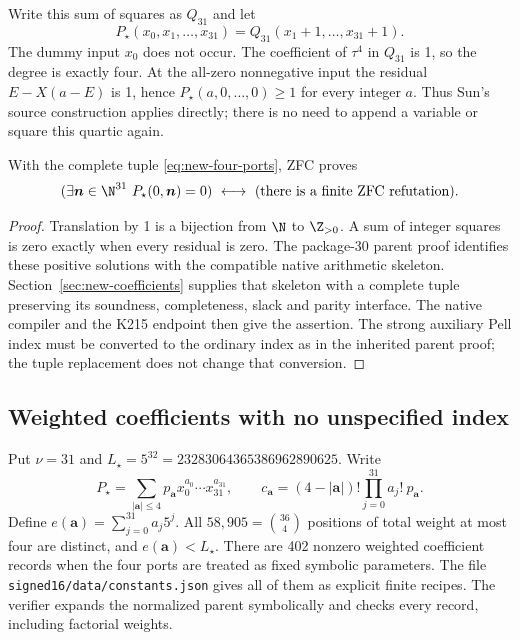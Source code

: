 Write this sum of squares as $Q_{31}$ and let
\[
 P_\star(x_0,x_1,\ldots,x_{31})
   =Q_{31}(x_1+1,\ldots,x_{31}+1).
\]
The dummy input $x_0$ does not occur.  The coefficient of $\tau^4$ in
$Q_{31}$ is 1, so the degree is exactly four.  At the all-zero
nonnegative input the residual $E-X(a-E)$ is 1, hence
$P_\star(a,0,\ldots,0)\geq1$ for every integer $a$.  Thus Sun's source
construction applies directly; there is no need to append a variable or
square this quartic again.

\begin{proposition}\label{prop:parent}
With the complete tuple \eqref{eq:new-four-ports}, ZFC proves
\[
 (\exists\boldsymbol{n}\in\N^{31}\ P_\star(0,\boldsymbol{n})=0)
 \ \longleftrightarrow\ 
 (\text{there is a finite ZFC refutation}).
\]
\end{proposition}
\begin{proof}
Translation by 1 is a bijection from $\N$ to $\Z_{>0}$.  A sum of integer
squares is zero exactly when every residual is zero.  The package-30
parent proof identifies these positive solutions with the compatible
native arithmetic skeleton.  Section~\ref{sec:new-coefficients} supplies
that skeleton with a complete tuple preserving its soundness,
completeness, slack and parity interface.  The native compiler and the
K215 endpoint then give the assertion.  The strong auxiliary Pell index
must be converted to the ordinary index as in the inherited parent
proof; the tuple replacement does not change that conversion.
\end{proof}

\subsection{Weighted coefficients with no unspecified index}

Put $\nu=31$ and $L_\star=5^{32}=23283064365386962890625$.  Write
\[
 P_\star=\sum_{|\boldsymbol{a}|\le4}p_{\boldsymbol a}
                x_0^{a_0}\cdots x_{31}^{a_{31}},\qquad
 c_{\boldsymbol a}=(4-|\boldsymbol a|)!
              \prod_{j=0}^{31}a_j!\ p_{\boldsymbol a}.
\]
Define $e(\boldsymbol a)=\sum_{j=0}^{31}a_j5^j$.
All $58,905=\binom{36}{4}$ positions of total weight at most four are
distinct, and $e(\boldsymbol a)<L_\star$.  There are 402 nonzero weighted
coefficient records when the four ports are treated as fixed symbolic
parameters.  The file \texttt{signed16/data/constants.json} gives all of
them as explicit finite recipes.  The verifier expands the normalized
parent symbolically and checks every record, including factorial weights.

